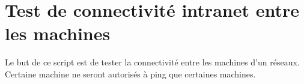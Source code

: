 \documentclass[../file_doc_script.tex]{subfiles}
\begin{document}
\section{Test de connectivité intranet entre les machines}
Le but de ce script est de tester la connectivité entre les machines d'un réseaux.
Certaine machine ne seront autorisés à ping que certaines machines.

\UseRawInputEncoding

\end{document}
